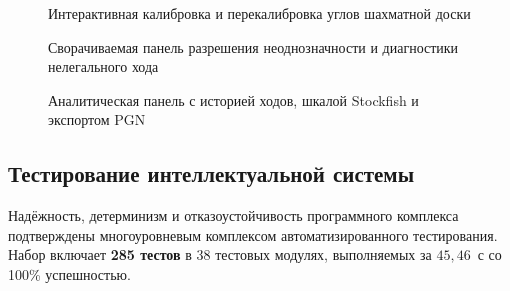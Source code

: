 \begin{figure}[htbp]
\centering
{}
\caption{Интерактивная калибровка и перекалибровка углов шахматной доски}
\label{fig:ui-calibration}
\end{figure}

\begin{figure}[htbp]
\centering
{}
\caption{Сворачиваемая панель разрешения неоднозначности и диагностики нелегального хода}
\label{fig:ui-uncertain}
\end{figure}

\begin{figure}[htbp]
\centering
{}
\caption{Аналитическая панель с историей ходов, шкалой Stockfish и экспортом PGN}
\label{fig:ui-history-eval}
\end{figure}

\subsection{Тестирование интеллектуальной системы}

Надёжность, детерминизм и отказоустойчивость программного комплекса подтверждены многоуровневым комплексом автоматизированного тестирования. Набор включает \textbf{285 тестов} в 38 тестовых модулях, выполняемых за $45{,}46$~с со 100\% успешностью.

